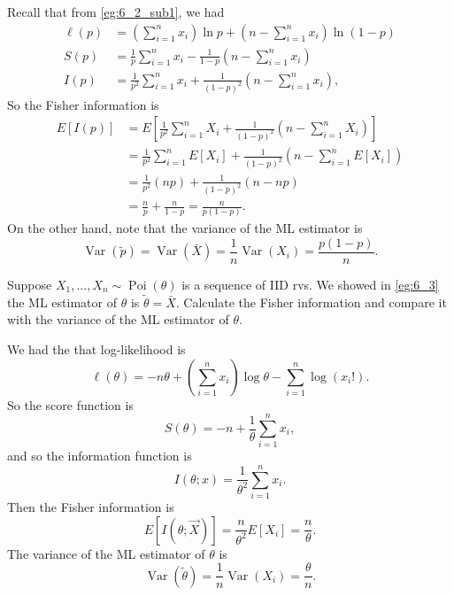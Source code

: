 \documentclass[notoc,notitlepage]{tufte-book}
\DeclareMathOperator{\Poi}{Poi }
\DeclareMathOperator{\Var}{Var }
\begin{document}
\begin{solution}
  Recall that from \cref{eg:6_2_sub1}, we had
  \begin{align*}
    \ell(p) &= \left( \sum_{i=1}^{n} x_i \right) \ln p + \left( n - \sum_{i=1}^{n} x_i \right) \ln ( 1 - p ) \\
    S(p) &= \frac{1}{p} \sum_{i=1}^{n} x_i - \frac{1}{1 - p} \left( n - \sum_{i=1}^{n} x_i \right) \\
    I(p) &= \frac{1}{p^2} \sum_{i=1}^{n} x_i + \frac{1}{(1 - p)^2} \left( n - \sum_{i=1}^{n} x_i \right),
  \end{align*}
  So the Fisher information is
  \begin{align*}
    E[ I(p) ] &= E\left[ \frac{1}{p^2} \sum_{i=1}^{n} X_i + \frac{1}{(1 - p)^2} \left( n - \sum_{i=1}^{n} X_i \right) \right] \\
              &= \frac{1}{p^2} \sum_{i=1}^{n} E[X_i] + \frac{1}{(1 - p)^2} \left( n - \sum_{i=1}^{n} E[X_i] \right) \\
              &= \frac{1}{p^2} ( np ) + \frac{1}{(1 - p)^2} ( n - np ) \\
              &= \frac{n}{p} + \frac{n}{1 - p} = \frac{n}{p ( 1 - p )}.
  \end{align*}
  On the other hand, note that the variance of the ML estimator is
  \begin{equation*}
    \Var(\tilde{p}) = \Var(\bar{X}) = \frac{1}{n} \Var(X_i) = \frac{p( 1 - p )}{n}.
  \end{equation*}
\end{solution}

\begin{eg}
  Suppose $X_1, ..., X_n \sim \Poi(\theta)$ is a sequence of IID rvs. We showed in \cref{eg:6_3} the ML estimator of $\theta$ is $\tilde{\theta} = \bar{X}$. Calculate the Fisher information and compare it with the variance of the ML estimator of $\theta$.
\end{eg}

\begin{solution}
  We had the that log-likelihood is
  \begin{equation*}
    \ell(\theta) = -n \theta + \left( \sum_{i=1}^{n} x_i \right) \log \theta - \sum_{i=1}^{n} \log (x_i!).
  \end{equation*}
  So the score function is
  \begin{equation*}
    S(\theta) = -n + \frac{1}{\theta} \sum_{i=1}^{n} x_i,
  \end{equation*}
  and so the information function is
  \begin{equation*}
    I(\theta; x) = \frac{1}{\theta^2} \sum_{i=1}^{n} x_i.
  \end{equation*}
  Then the Fisher information is
  \begin{equation*}
    E[ I(\theta; \vec{X}) ] = \frac{n}{\theta^2} E[X_i] = \frac{n}{\theta}.
  \end{equation*}
  The variance of the ML estimator of $\theta$ is
  \begin{equation*}
    \Var(\tilde{\theta}) = \frac{1}{n} \Var(X_i) = \frac{\theta}{n}.
  \end{equation*}
\end{solution}
\end{document}
